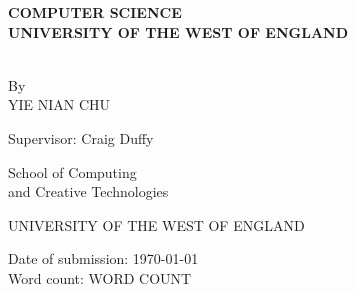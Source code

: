\documentclass[12pt]{report}
\author{Yie Nian Chu}
\numberwithin{figure}{chapter}
\begin{document}
\begin{titlepage}
\begin{center}
    
    \vspace{2.3cm}
    
    {}

    \vspace{1cm}
    {\textbf{COMPUTER SCIENCE\\}}
    \vspace{0.3cm}
    {\textbf{UNIVERSITY OF THE WEST OF ENGLAND\\}}
    \vspace{2.4cm}
    
    {}\\
    By\\
    YIE NIAN CHU\\
    \vspace{0.9cm}
    {\begin{singlespace}Supervisor: Craig Duffy\\\end{singlespace}}
\end{center}
{\raggedleft\vfill{\begin{singlespace}
     School of Computing \\and Creative Technologies\\
\end{singlespace}
 UNIVERSITY OF THE WEST OF ENGLAND\\
 \begin{singlespace}
 Date of submission: \today\\
 Word count: WORD COUNT\\
 \end{singlespace}
}\par
}
\end{titlepage}
\end{document}
